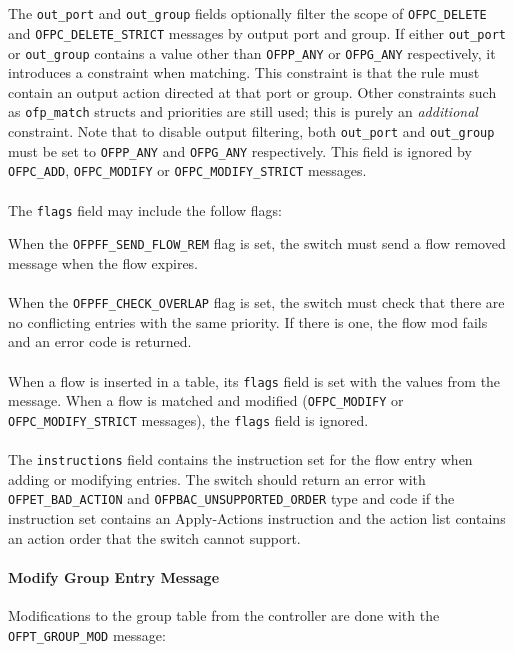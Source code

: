 \\\\
The \verb|out_port| and \verb|out_group| fields optionally filter the scope of  \verb|OFPC_DELETE| and \verb|OFPC_DELETE_STRICT| messages by output port and group.  If either \verb|out_port| or \verb|out_group| contains a value other than \verb|OFPP_ANY| or \verb|OFPG_ANY| respectively, it introduces a constraint when matching.  This constraint is that the rule must contain an output action directed at that port or group.  Other constraints such as \verb|ofp_match| structs and priorities are still used; this is purely an \emph{additional} constraint.  Note that to disable output filtering, both \verb|out_port| and \verb|out_group| must be set to \verb|OFPP_ANY| and \verb|OFPG_ANY| respectively.  This field is ignored by \verb|OFPC_ADD|, \verb|OFPC_MODIFY| or \verb|OFPC_MODIFY_STRICT| messages.
\\\\
The \verb|flags| field may include the follow flags:


When the \verb|OFPFF_SEND_FLOW_REM| flag is set, the switch must send a flow removed message when the flow expires.
\\\\
When the \verb|OFPFF_CHECK_OVERLAP| flag is set, the switch must check that there are no conflicting entries with the same priority. If there is one, the flow mod fails and an error code is returned.
\\\\
When a flow is inserted in a table, its \verb|flags| field is set with the values from the message. When a flow is matched and modified (\verb|OFPC_MODIFY| or \verb|OFPC_MODIFY_STRICT| messages), the \verb|flags| field is ignored.
\\\\
The \verb|instructions| field contains the instruction set for the flow entry when adding or modifying entries. The switch should return an error with \verb|OFPET_BAD_ACTION| and \verb|OFPBAC_UNSUPPORTED_ORDER| type and code if the instruction set contains an Apply-Actions instruction and the action list contains an action order that the switch cannot support.

\paragraph{Modify Group Entry Message}
Modifications to the group table from the controller are done with the \verb|OFPT_GROUP_MOD| message:

